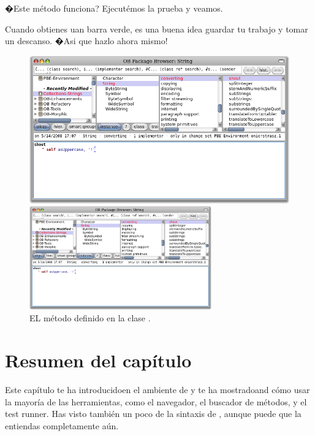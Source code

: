 \documentclass[a4paper,10pt,twoside]{book}
\begin{document}
�Este m\'etodo funciona? Ejecut\'emos la prueba y veamos.

Cuando obtienes uan barra verde\footnotemark, es una buena idea guardar tu trabajo y tomar un descanso.  
�Asi que hazlo ahora mismo!

\begin{figure}[hbt]
\ifluluelse
	{\centerline{\includegraphics[width=\textwidth]{String-Shout}}}
	{\centerline{\includegraphics[width=0.7\textwidth]{String-Shout}}}
\caption{EL m\'etodo  definido en la clase .
}
\end{figure}

\section{Resumen del cap\'itulo}
Este cap\'itulo te ha introducidoen el ambiente de \pharo y te ha mostradoand c\'omo usar la mayor\'ia de las herramientas, como el navegador, el buscador de m\'etodos, y el test runner. Has visto tambi\'en un poco de la sintaxis de \pharo, aunque puede que la entiendas completamente a\'un.
\end{document}
